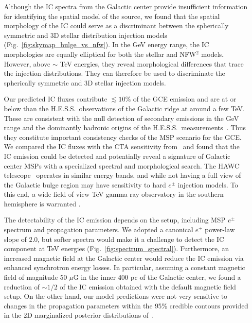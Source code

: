 \documentclass[doublespace,nopageskip]{VTthesis}
\begin{document}
Although the IC spectra from the Galactic center provide insufficient information for identifying the spatial model of the source, we found that the spatial morphology of the IC could serve as a discriminant between the spherically symmetric and 3D stellar distribution injection models (Fig.~\ref{fig:skymap_bulge_vs_nfw}). In the GeV energy range, the IC morphologies are equally elliptical for both the stellar and NFW$^2$ models. However, above $\sim$ TeV energies, they reveal morphological differences that trace the injection distributions. They can therefore be used to discriminate the spherically symmetric and 3D stellar injection models.

Our predicted IC fluxes contribute $\lesssim 10 \%$ of the GCE emission and are at or below than the H.E.S.S.~observations of the Galactic ridge at around a  few TeV. These are consistent with the null detection of secondary emissions in the GeV range \cite{2016PhRvD..93j3004L} and the dominantly hadronic origins of the H.E.S.S.~measurements~\cite{2017PhRvL.119c1101G,2016Natur.531..476H}. Thus they constitute important consistency checks of the MSP scenario for the GCE. We compared the IC fluxes with the CTA sensitivity from~\citet{2015JCAP...03..055S} and found that the IC emission could be detected and potentially reveal a signature of Galactic center MSPs with a specialized spectral and morphological search. The HAWC telescope~\cite{2012NIMPA.692...72D,2013arXiv1310.0074H} operates in similar energy bands, and while not having a full view of the Galactic bulge region may have sensitivity to hard $e^\pm$ injection models. To this end, a wide field-of-view TeV gamma-ray observatory in the southern hemisphere is warranted \cite{2017ICRC...35..851M}.

The detectability of the IC emission depends on the setup, including MSP $e^\pm$ spectrum and propagation parameters. We adopted a canonical $e^\pm$ power-law slope of 2.0, but softer spectra would make it a challenge to detect the IC component at TeV energies (Fig.~\ref{fig:spectrum_spectral}). Furthermore, an increased magnetic field at the Galactic center would reduce the IC emission via enhanced synchrotron energy losses. In particular, assuming a constant magnetic field of magnitude 50 $\mu$G in the inner 400 pc of the Galactic center, we found a reduction of $\sim 1/2$ of the IC emission obtained with the default magnetic field setup. On the other hand, our model predictions were not very sensitive to changes in the propagation parameters within the 95\% credible contours provided in the 2D marginalized posterior distributions of~\citet{2016ApJ...824...16J}.
\end{document}
